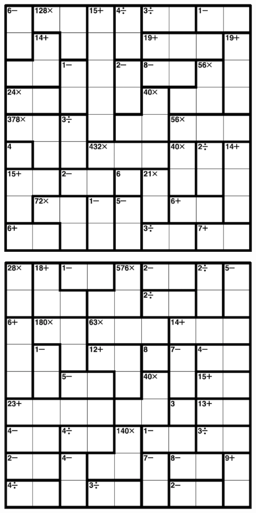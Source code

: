 
\includegraphics[scale=1]{Gambar/Lampiran/9x9_1.png}

\includegraphics[scale=1]{Gambar/Lampiran/9x9_2.png}
